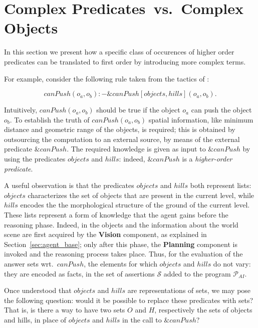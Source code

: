 \section{Complex Predicates~vs.~Complex Objects}
\label{sec:main}

In this section we present how a specific class of occurences of higher order predicates can be translated to first order by introducing more complex terms.

For example, consider the following rule taken from the tactics of \ah:


$$ canPush(o_a,o_b) :- \&canPush[objects,hills](o_a,o_b). \label{main:rule-1} $$

Intuitively, $canPush(o_a, o_b)$ should be true if the object $o_a$ can push the object $o_b$.
To establish the truth of $canPush(o_a, o_b)$ spatial information, like minimum distance and geometric range of the objects, is required; this is obtained by outsourcing the computation to an external source, by means of the external predicate $\&canPush$.
The required knowledge is given as input to $\&canPush$ by using the predicates $objects$ and $hills$: indeed, $\&canPush$ is a \emph{higher-order predicate}.

A useful observation is that the predicates $objects$ and $hills$ both represent lists: $objects$ characterizes the set of objects that are present in the current level, while $hills$ encodes the the morphological structure of the ground of the current level.
These lists represent a form of knowledge that the agent gains before the reasoning phase.
Indeed, in \ah the objects and the information about the world scene are first acquired by the \textbf{Vision} component, as explained in Section~\ref{sec:agent_base}; only after this phase, the \textbf{Planning} component is invoked and the reasoning process takes place.
Thus, for the evaluation of the answer sets wrt.~$canPush$, the elements for which $objects$ and $hills$ do not vary: they are encoded as facts, in the set of assertions \(\mathcal{S}\) added to the program \(\mathcal{P}_{AI}\).

Once understood that $objects$ and $hills$ are representations of sets, we may pose the following question: would it be possible to replace these predicates with sets?
That is, is there a way to have two sets $O$ and $H$, respectively the sets of objects and hills, in place of  $objects$ and $hills$ in the call to $\&canPush$?


